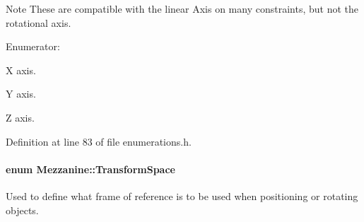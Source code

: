 \begin{DoxyNote}{Note}
These are compatible with the linear Axis on many constraints, but not the rotational axis. 
\end{DoxyNote}
\begin{Desc}
\item[Enumerator\-: ]\par
\begin{description}
\item[{\em 
\hypertarget{namespaceMezzanine_ab41a00a8c6a47b576dc987ec34e16ba1a823c8f182393aef96f017c7279d49126}{Axis\-\_\-\-X}\label{namespaceMezzanine_ab41a00a8c6a47b576dc987ec34e16ba1a823c8f182393aef96f017c7279d49126}
}]X axis. \item[{\em 
\hypertarget{namespaceMezzanine_ab41a00a8c6a47b576dc987ec34e16ba1a935c7afe0104697553cf85e9214fb3fb}{Axis\-\_\-\-Y}\label{namespaceMezzanine_ab41a00a8c6a47b576dc987ec34e16ba1a935c7afe0104697553cf85e9214fb3fb}
}]Y axis. \item[{\em 
\hypertarget{namespaceMezzanine_ab41a00a8c6a47b576dc987ec34e16ba1a6af6621383cc7da1fe11a86ba6de37c0}{Axis\-\_\-\-Z}\label{namespaceMezzanine_ab41a00a8c6a47b576dc987ec34e16ba1a6af6621383cc7da1fe11a86ba6de37c0}
}]Z axis. \end{description}
\end{Desc}



Definition at line 83 of file enumerations.\-h.

\hypertarget{namespaceMezzanine_ad81c74de3529f1e643bd145173924ed3}{
\paragraph[{Transform\-Space}]{\setlength{\rightskip}{0pt plus 5cm}enum {\bf Mezzanine\-::\-Transform\-Space}}}\label{namespaceMezzanine_ad81c74de3529f1e643bd145173924ed3}


Used to define what frame of reference is to be used when positioning or rotating objects. 

